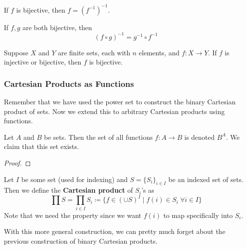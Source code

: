   \begin{theorem}
    If $f$ is bijective, then $f = (f^{-1})^{-1}$. 
  \end{theorem}

  \begin{theorem}
    If $f, g$ are both bijective, then 
    \begin{equation}
      (f \circ g)^{-1} = g^{-1} \circ f^{-1}
    \end{equation}
  \end{theorem}

  \begin{theorem}
    Suppose $X$ and $Y$ are finite sets, each with $n$ elements, and $f: X \rightarrow Y$. If $f$ is injective or bijective, then $f$ is bijective. 
  \end{theorem} 

\subsubsection{Cartesian Products as Functions} 

  Remember that we have used the power set to construct the binary Cartesian product of sets. Now we extend this to arbitrary Cartesian products using functions. 

  \begin{lemma} 
    Let $A$ and $B$ be sets. Then the set of all functions $f: A \rightarrow B$ is denoted $B^A$. We claim that this set exists. 
  \end{lemma}
  \begin{proof}
    
  \end{proof}

  \begin{definition}
    Let $I$ be some set (used for indexing) and $S = \{S_i\}_{i \in I}$ be an indexed set of sets. Then we define the \textbf{Cartesian product} of $S_i$'s as 
    \begin{equation}
      \prod S = \prod_{i \in I} S_i \coloneqq \{f \in (\cup S)^I \mid f(i) \in S_i \; \forall i \in I \}
    \end{equation}
    Note that we need the property since we want $f(i)$ to map specifically into $S_i$. 
  \end{definition}

  With this more general construction, we can pretty much forget about the previous construction of binary Cartesian products. 

